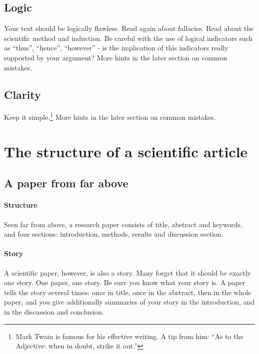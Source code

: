 \documentclass{tufte-book}
\begin{document}
\subsection{Logic}

Your text should be logically flawless. Read again about fallacies. Read about the scientific method and induction. Be careful with the use of logical indicators such as ``thus'', ``hence'', ``however'' - is the implication of this indicators really supported by your argument? More hints in the later section on common mistakes.

\subsection{Clarity}

Keep it simple.\footnote{Mark Twain is famous for his effective writing. A tip from him: ``As to the Adjective: when in doubt, strike it out.''} More hints in the later section on common mistakes.

\section{The structure of a scientific article}   

\subsection{A paper from far above}

\paragraph{Structure}Seen far from above, a research paper consists of title, abstract and keywords, and four sections: introduction, methods, results and discussion section. 

\paragraph{Story}A scientific paper, however, is also a story. Many forget that it should be exactly one story. One paper, one story. Be sure you know what your story is. A paper tells the story several times: once in title, once in the abstract, then in the whole paper, and you give additionally summaries of your story in the introduction, and in the discussion and  conclusion.

\end{document}
